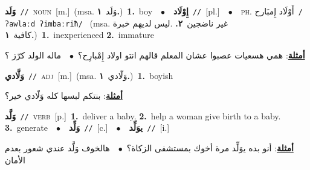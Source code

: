\documentclass[10pt,a4paper,twoside]{article} %
\begin{document}
\begin{multicols}{2}
{\setlength\topsep{0pt}\textbf{\foreignlanguage{arabic}{وَلَد}}\ {\color{gray}\texttt{//}\color{black}}\ \textsc{noun}\ [m.]\ \color{gray}(msa. \foreignlanguage{arabic}{وَلَد}~\foreignlanguage{arabic}{\textbf{١.}})\color{black}\ \textbf{1.}~boy\ \ $\bullet$\ \ \setlength\topsep{0pt}\textbf{\foreignlanguage{arabic}{إِوْلَاد}}\ {\color{gray}\texttt{//}\color{black}}\ [pl.]\ \ $\bullet$\ \ \textsc{ph.} \color{gray} \foreignlanguage{arabic}{أَوْلَاد إِمبَارح}\color{black}\ {\color{gray}\texttt{/{\sffamily ʔawlaːd ʔimbaːriħ}/}\color{black}}\ \color{gray} (msa. \foreignlanguage{arabic}{غير ناضجين}~\foreignlanguage{arabic}{\textbf{٢.}}  .\foreignlanguage{arabic}{ليس لديهم خبرة كافية}~\foreignlanguage{arabic}{\textbf{١.}})\color{black}\ \textbf{1.}~inexperienced  \textbf{2.}~immature\  \begin{flushright}\color{gray}\foreignlanguage{arabic}{\textbf{\underline{\foreignlanguage{arabic}{أمثلة}}}: همي هسعيات عصبوا عشان المعلم قالهم انتو اولاد إِمْبارِح؟\ $\bullet$\ \  ماله الولد كرّز ؟}\end{flushright}\color{black}} \vspace{2mm}

{\setlength\topsep{0pt}\textbf{\foreignlanguage{arabic}{وَلَّادي}}\ {\color{gray}\texttt{//}\color{black}}\ \textsc{adj}\ [m.]\ \color{gray}(msa. \foreignlanguage{arabic}{وَلّادي}~\foreignlanguage{arabic}{\textbf{١.}})\color{black}\ \textbf{1.}~boyish\  \begin{flushright}\color{gray}\foreignlanguage{arabic}{\textbf{\underline{\foreignlanguage{arabic}{أمثلة}}}: بنتكم لبسها كله وَلّادي خير؟}\end{flushright}\color{black}} \vspace{2mm}

{\setlength\topsep{0pt}\textbf{\foreignlanguage{arabic}{وَلَّد}}\ {\color{gray}\texttt{//}\color{black}}\ \textsc{verb}\ [p.]\ \textbf{1.}~deliver a baby.  \textbf{2.}~help a woman give birth to a baby.  \textbf{3.}~generate\ \ $\bullet$\ \ \setlength\topsep{0pt}\textbf{\foreignlanguage{arabic}{وَلِّد}}\ {\color{gray}\texttt{//}\color{black}}\ [c.]\ \ $\bullet$\ \ \setlength\topsep{0pt}\textbf{\foreignlanguage{arabic}{يوَلِّد}}\ {\color{gray}\texttt{//}\color{black}}\ [i.]\  \begin{flushright}\color{gray}\foreignlanguage{arabic}{\textbf{\underline{\foreignlanguage{arabic}{أمثلة}}}: أنو بده يوَلِّد مرة أخوك بمستشفى الزكاة؟\ $\bullet$\ \  هالخوف وَلَّد عندي شعور بعدم الأمان}\end{flushright}\color{black}} \vspace{2mm}


\end{multicols}
\end{document}
